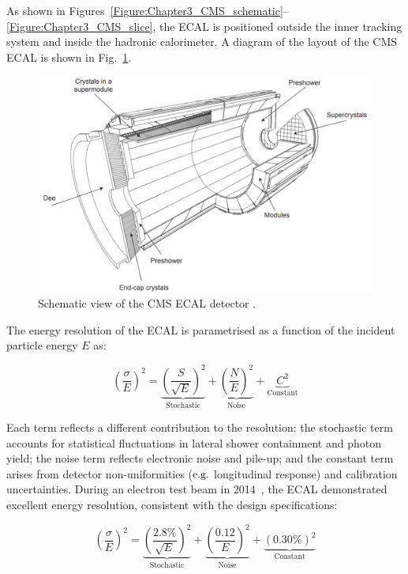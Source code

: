 As shown in Figures~\ref{Figure:Chapter3_CMS_schematic}--\ref{Figure:Chapter3_CMS_slice}, the ECAL is positioned outside the inner tracking system and inside the hadronic calorimeter. A diagram of the layout of the CMS ECAL is shown in Fig.~\ref{Figure:Chapter3_CMS_ECAL}.

\begin{figure}[h]
\centering
\includegraphics[width= 1.0\textwidth]{Figures/Chapter3/CMS_ECAL.pdf}
\caption{Schematic view of the CMS ECAL detector \cite{LHC_CMS}.}
\label{Figure:Chapter3_CMS_ECAL}
\end{figure}

The energy resolution of the ECAL is parametrised as a function of the incident particle energy $E$ as:

\begin{equation}
    \left(\frac{\sigma}{E}\right)^2 =  \underbrace{\left(\frac{S}{\sqrt{E}}\right)^2}_{\text{Stochastic}} +  \underbrace{\left(\frac{N}{E}\right)^2}_{\text{Noise}} +  \underbrace{C^2}_{\text{Constant}}
\end{equation}

Each term reflects a different contribution to the resolution: the stochastic term accounts for statistical fluctuations in lateral shower containment and photon yield; the noise term reflects electronic noise and pile-up; and the constant term arises from detector non-uniformities ($\mbox{e.g.}$ longitudinal response) and calibration uncertainties. During an electron test beam in 2014~\cite{ECAL_TestBeam}, the ECAL demonstrated excellent energy resolution, consistent with the design specifications:

\begin{equation}
    \left(\frac{\sigma}{E}\right)^2 =  \underbrace{\left(\frac{2.8\%}{\sqrt{E}}\right)^2}_{\text{Stochastic}} +  \underbrace{\left(\frac{0.12}{E}\right)^2}_{\text{Noise}} +  \underbrace{(0.30\%)^2}_{\text{Constant}}
\end{equation}


